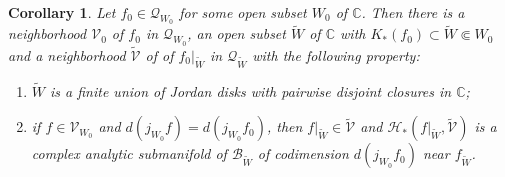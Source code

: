 \documentclass{amsart}
\numberwithin{equation}{section}
\newtheorem{corollary}[theorem]{Corollary}%
\newcommand{\C}{\mathbb C}
\theoremstyle{definition}
\theoremstyle{remark}
\begin{document}
\begin{corollary}\label{cor:mate}
Let $f_0\in \mathcal{Q}_{W_0}$ for some open subset $W_0$ of 
$\C$. Then there is a neighborhood $\mathcal{V}_0$ of $f_0$ in $\mathcal{Q}_{W_0}$, an open subset $\widetilde{W}$ of $\C$ with $K_*(f_0)\subset \widetilde{W}\Subset W_0$ and a neighborhood $\widetilde{\mathcal{V}}$ of of $f_0|_{\widetilde{W}}$ in $\mathcal{Q}_{\widetilde{W}}$ with the following property: 
\begin{enumerate}
\item [(i)] $\widetilde{W}$ is a finite union of Jordan disks with pairwise disjoint closures in $\C$; 
\item [(ii)] if $f\in \mathcal{V}_{W_0}$ and $d(j_{W_0}f)=d(j_{W_0}f_0)$, then $f|_{\widetilde{W}}\in \widetilde{\mathcal{V}}$ and $\mathcal{H}_*(f|_{\widetilde{W}},\widetilde{\mathcal{V}})$ is a complex analytic submanifold of $\mathcal{B}_{\widetilde{W}}$ of codimension $d(j_{W_0}f_0)$ near $f_{\widetilde{W}}$.
\end{enumerate}
\end{corollary}
\end{document}
